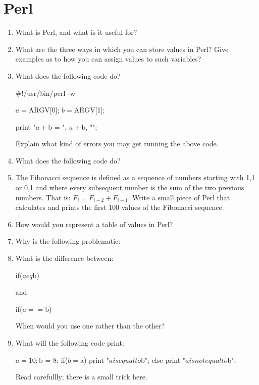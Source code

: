 \documentclass[11pt]{article}
\begin{document}
\section{Perl}
\begin{enumerate}
\item What is Perl, and what is it useful for?
\item What are the three ways in which you can store values in Perl? Give
  examples as to how you can assign values to such variables?
\item What does the following code do?

  \begin{perlcode}
    #!/usr/bin/perl -w
    
    $a = $ARGV[0];
    $b = $ARGV[1];

    print "$a + $b = ", $a + $b, "\n";
    
  \end{perlcode}
  Explain what kind of errors you may get running the above code.
\item What does the following code do?

\item The Fibonacci sequence is defined as a sequence of numbers starting
  with 1,1 or 0,1 and where every subsequent number is the sum of the two
  previous numbers. That is: $F_i = F_{i-2} + F_{i-1}$. Write a small piece
  of Perl that calculates and prints the first 100 values of the Fibonacci
  sequence.
\item How would you represent a table of values in Perl?
\item Why is the following problematic:

\item What is the difference between:

  \begin{perlcode}
    if($a eq $b)
  \end{perlcode}
  and

  \begin{perlcode}
    if($a == $b)
  \end{perlcode}
  When would you use one rather than the other?
\item What will the following code print:

  \begin{perlcode}
  $a = 10;
  $b = 8;
  if($b = $a){
    print "$a is equal to $b\n";
  }else{
    print "$a is not equal to $b\n";
  }
  \end{perlcode}
  Read carefullly; there is a small trick here.
\end{enumerate}
\end{document}
